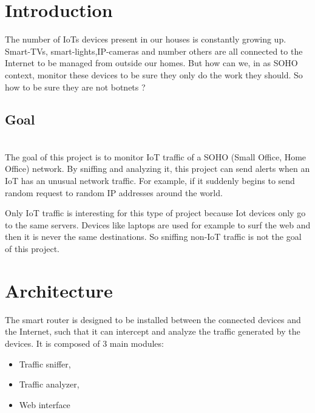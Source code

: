 \begin{frame}{}
\begin{multicols}{3}



\section{Introduction}
The number of IoTs devices present in our houses is constantly growing up. Smart-TVs, smart-lights,IP-cameras and number others are all connected to the Internet to be managed from outside our homes. But how can we, in as SOHO context, monitor these devices to be sure they only do the work they should. So how to be sure they are not botnets ? 

\subsection{Goal}\\
The goal of this project is to monitor IoT traffic of a SOHO (Small Office, Home Office) network. By sniffing and analyzing it, this project can send alerts when an IoT has an unusual network traffic. For example, if it suddenly begins to send random request to random IP addresses around the world.

Only IoT traffic is interesting for this type of project because Iot devices only go to the same servers. Devices like laptops are used for example to surf the web and then it is never the same destinations. So sniffing non-IoT traffic is not the goal of this project. 



\section{Architecture}

The smart router is designed to be installed between the connected devices and the Internet, such that it can intercept and analyze the traffic generated by the devices. It is composed of 3 main modules:

\begin{itemize}
\item Traffic sniffer,
\item Traffic analyzer,
\item Web interface
\end{itemize}


\end{multicols}
\end{frame}

